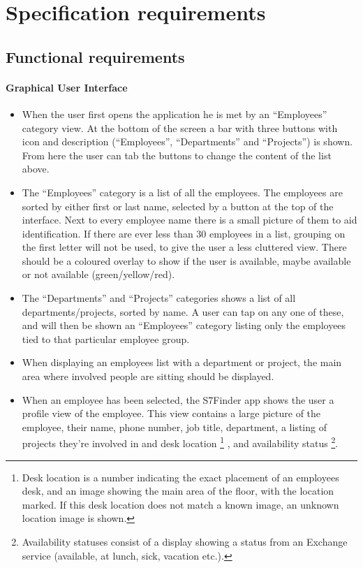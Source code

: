 \section{Specification requirements}

\subsection{Functional requirements} %
\label{sub:Functionalrequirements}

\paragraph{Graphical User Interface}
\begin{itemize}
    \item When the user first opens the application he is met
        by an ``Employees'' category view. At the bottom of the screen
        a bar with three buttons with icon and
        description (``Employees'', ``Departments'' and
        ``Projects'') is shown. From here the user can tab the buttons to change
        the content of the list above.

    \item The ``Employees'' category is a list of all the
      employees. The employees are sorted by either first or last
      name, selected by a button at the top of the interface. Next to
      every employee name there is a small picture of them to aid
      identification. If there are ever less than 30 employees in a
      list, grouping on the first letter will not be used, to give the
      user a less cluttered view. There should be a coloured overlay to
      show if the user is available, maybe available or not available
      (green/yellow/red).

    \item The ``Departments'' and ``Projects'' categories shows a list
      of all departments/projects, sorted by name.  A user can tap on
      any one of these, and will then be shown an ``Employees''
      category listing only the employees tied to that particular
      employee group.

    \item When displaying an employees list with a department or project,
      the main area where involved people are sitting should be displayed.

    \item When an employee has been selected, the S7Finder app shows
      the user a profile view of the employee. This view contains a
      large picture of the employee, their name, phone number, job
      title, department, a listing of projects they're involved in and
      desk location
        \footnote{Desk location is a number indicating the exact
          placement of an employees desk, and an image showing the
          main area of the floor, with the location marked. If this desk location
          does not match a known image, an unknown location image is shown.}
      , and availability status
        \footnote{Availability statuses consist of a display showing a
          status from an Exchange service (available, at lunch, sick,
          vacation etc.).}.


\end{itemize}
